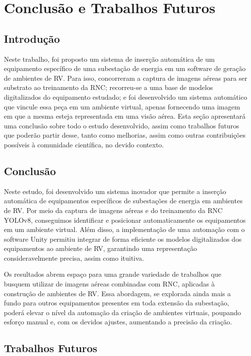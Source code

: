 \chapter{Conclusão e Trabalhos Futuros}

\section{Introdução} 

Neste trabalho, foi proposto um sistema de inserção automática de um equipamento específico de uma subestação de energia em um software de geração de ambientes de RV. Para isso, concorreram a captura de imagens aéreas para ser substrato ao treinamento da RNC; recorreu-se a uma base de modelos digitalizados do equipamento estudado; e foi desenvolvido um sistema automático que vincule essa peça em um ambiente virtual, apenas fornecendo uma imagem em que a mesma esteja representada em uma visão aérea. Esta seção apresentará uma conclusão sobre todo o estudo desenvolvido, assim como trabalhos futuros que poderão partir desse, tanto como melhorias, assim como outras contribuições possíveis à comunidade científica, no devido contexto.

\section{Conclusão} 

Neste estudo, foi desenvolvido um sistema inovador que permite a inserção automática de equipamentos específicos de subestações de energia em ambientes de RV. Por meio da captura de imagens aéreas e do treinamento da RNC YOLOv8, conseguimos identificar e posicionar automaticamente os equipamentos em um ambiente virtual. Além disso, a implementação de uma automação com o software Unity permitiu integrar de forma eficiente os modelos digitalizados dos equipamentos ao ambiente de RV, garantindo uma representação consideravelmente precisa, assim como ituitiva.

Os resultados abrem espaço para uma grande variedade de trabalhos que busquem utilizar de imagens aéreas combinadas com RNC, aplicadas à construção de ambientes de RV. Essa abordagem, se explorada ainda mais a fundo para outros equipamentos presentes em toda extensão da subestação, poderá elevar o nível da automação da criação de ambientes virtuais, poupando esforço manual e, com os devidos ajustes, aumentando a precisão da criação.

\section{Trabalhos Futuros} 

